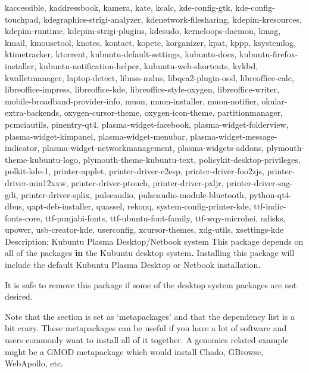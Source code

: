 \documentclass[]{article}
\newenvironment{Shaded}{}{}
\newcommand{\KeywordTok}[1]{\textcolor[rgb]{0.00,0.44,0.13}{\textbf{{#1}}}}
\newcommand{\NormalTok}[1]{{#1}}
\begin{document}
\begin{Shaded}
\begin{Highlighting}[]
            \NormalTok{kaccessible, kaddressbook, kamera, kate, kcalc, kde-config-gtk, kde-config-touchpad, kdegraphics-strigi-analyzer,}
            \NormalTok{kdenetwork-filesharing, kdepim-kresources, kdepim-runtime, kdepim-strigi-plugins, kdesudo, kerneloops-daemon, kmag, kmail,}
            \NormalTok{kmousetool, knotes, kontact, kopete, korganizer, kpat, kppp, ksystemlog, ktimetracker, ktorrent, kubuntu-default-settings,}
            \NormalTok{kubuntu-docs, kubuntu-firefox-installer, kubuntu-notification-helper, kubuntu-web-shortcuts, kvkbd, kwalletmanager,}
            \NormalTok{laptop-detect, libnss-mdns, libqca2-plugin-ossl, libreoffice-calc, libreoffice-impress, libreoffice-kde,}
            \NormalTok{libreoffice-style-oxygen, libreoffice-writer, mobile-broadband-provider-info, muon, muon-installer, muon-notifier,}
            \NormalTok{okular-extra-backends, oxygen-cursor-theme, oxygen-icon-theme, partitionmanager, pcmciautils, pinentry-qt4,}
            \NormalTok{plasma-widget-facebook, plasma-widget-folderview, plasma-widget-kimpanel, plasma-widget-menubar,}
            \NormalTok{plasma-widget-message-indicator, plasma-widget-networkmanagement, plasma-widgets-addons, plymouth-theme-kubuntu-logo,}
            \NormalTok{plymouth-theme-kubuntu-text, policykit-desktop-privileges, polkit-kde-1, printer-applet, printer-driver-c2esp,}
            \NormalTok{printer-driver-foo2zjs, printer-driver-min12xxw, printer-driver-ptouch, printer-driver-pxljr, printer-driver-sag-gdi,}
            \NormalTok{printer-driver-splix, pulseaudio, pulseaudio-module-bluetooth, python-qt4-dbus, qapt-deb-installer, quassel, rekonq,}
            \NormalTok{system-config-printer-kde, ttf-indic-fonts-core, ttf-punjabi-fonts, ttf-ubuntu-font-family, ttf-wqy-microhei, udisks, upower,}
            \NormalTok{usb-creator-kde, userconfig, xcursor-themes, xdg-utils, xsettings-kde}
\NormalTok{Description: Kubuntu Plasma Desktop/Netbook system}
 \NormalTok{This package depends on all of the packages }\KeywordTok{in} \NormalTok{the Kubuntu desktop system}\KeywordTok{.} \NormalTok{Installing this package will include the default Kubuntu}
 \NormalTok{Plasma Desktop or Netbook installation}\KeywordTok{.} 

 \NormalTok{It is safe to remove this package if some of the desktop system packages are not desired.}
\end{Highlighting}
\end{Shaded}
Note that the section is set as `metapackages' and that the dependency
list is a bit crazy. These metapackages can be useful if you have a lot
of software and users commonly want to install all of it together. A
genomics related example might be a GMOD metapackage which would install
Chado, GBrowse, WebApollo, etc.
\end{document}
